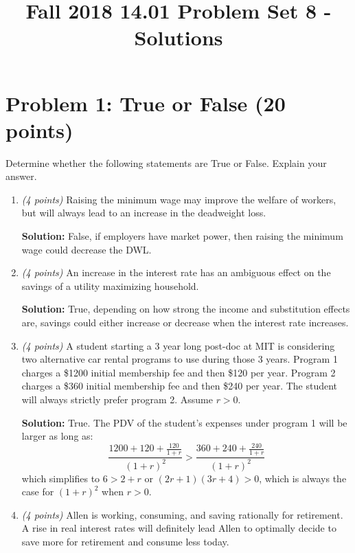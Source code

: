 \documentclass{article}
\begin{document}
\title{Fall 2018 14.01 Problem Set 8 - Solutions}
\maketitle

\section*{Problem 1: True or False (20 points)}
Determine whether the following statements are True or False. Explain your answer.

\begin{enumerate}
\item \emph{(4 points)} Raising the minimum wage may improve the welfare of workers, but will always lead to an increase in the deadweight loss.

\textbf{Solution:} False, if employers have market power, then raising the minimum wage could decrease the DWL.

\item \emph{(4 points)} An increase in the interest rate has an ambiguous effect on the savings of a utility maximizing household.

\textbf{Solution:} True, depending on how strong the income and substitution effects are, savings could either increase or decrease when the interest rate increases.

\item \emph{(4 points)} A student starting a 3 year long post-doc at MIT is considering two alternative car rental programs to use during those 3 years. Program 1 charges a \$1200 initial membership fee and then \$120 per year. Program 2 charges a \$360 initial membership fee and then \$240 per year. The student will always strictly prefer program 2. Assume $r > 0$.

\textbf{Solution:} True. The PDV of the student's expenses under program 1 will be larger as long as:
\begin{equation*}
\frac{1200 + 120 + \frac{120}{1 + r}}{(1 + r)^2} > \frac{360 + 240 + \frac{240}{1 + r}}{(1 + r)^2}
\end{equation*}
which simplifies to $6 > 2 + r$ or $(2r + 1)(3r + 4) > 0$, which is always the case for $(1 + r)^2$ when $r > 0$.

\item \emph{(4 points)} Allen is working, consuming, and saving rationally for retirement. A rise in real interest rates will definitely lead Allen to optimally decide to save more for retirement and consume less today.


\end{enumerate}
\end{document}
